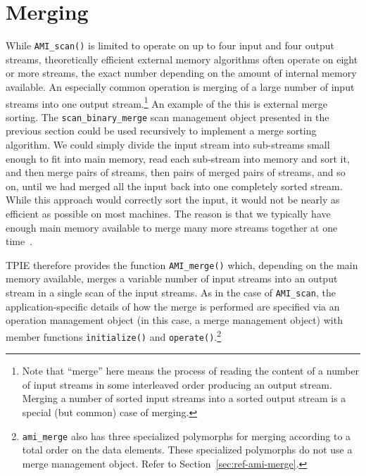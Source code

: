 \section{Merging} 

While \lstinline|AMI_scan()| is limited to operate on up to four input
and four output streams, theoretically efficient external memory
algorithms often operate on eight or more streams, the exact number
depending on the amount of internal memory available. An especially
common operation is merging of a large number of input streams into
one output stream.\footnote{Note that ``merge'' here means the process
  of reading the content of a number of input streams in some
  interleaved order producing an output stream.  Merging a number of
  sorted input streams into a sorted output stream is a special (but
  common) case of merging.} An example of the this is external merge
sorting. The \lstinline|scan_binary_merge| scan management object
presented in the previous section could be used recursively to
implement a merge sorting algorithm. We
could simply divide the input stream into sub-streams small enough to
fit into main memory, read each sub-stream into memory and sort it,
and then merge pairs of streams, then pairs of merged pairs of
streams, and so on, until we had merged all the input back into one
completely sorted stream. While this approach would correctly sort the
input, it would not be nearly as efficient as possible on most
machines. The reason is that we typically have enough main memory
available to merge many more streams together at one
time~\cite{aggarwal:input}.

TPIE therefore provides the function \lstinline|AMI_merge()|
which, depending on the main memory available, merges a
variable number of input streams into an output stream in a
single scan of the input streams. As in the case of
\lstinline|AMI_scan|, the application-specific details of how the merge
is performed are specified via an operation management
object (in this case, a  merge management object)
with member functions \lstinline|initialize()| and
\lstinline|operate()|.\footnote{%
  \lstinline|ami_merge| also has three specialized polymorphs for
  merging according to a total order on the data elements. These
  specialized polymorphs do not use a merge management object. Refer
  to Section~\ref{sec:ref-ami-merge}.} 
 
